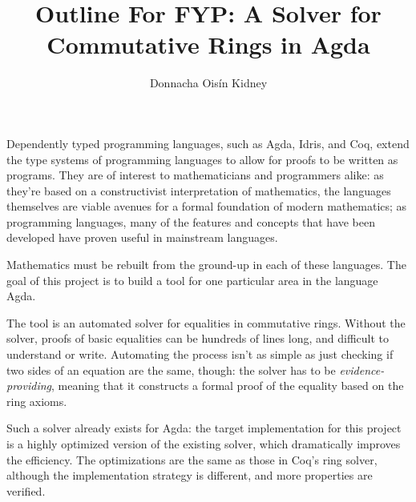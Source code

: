 \documentclass[twocolumn]{article}
\author{Donnacha Oisín Kidney}
\title{Outline For FYP: A Solver for Commutative Rings in Agda}
\begin{document}
\maketitle

Dependently typed programming languages, such as
Agda\cite{norell_dependently_2008}, Idris\cite{brady_idris_2013}, and
Coq\cite{the_coq_development_team_2018_1219885}, extend the type systems of
programming languages to allow for proofs to be written as programs. They are of
interest to mathematicians and programmers alike: as they're based on a
constructivist interpretation of mathematics, the languages themselves are
viable avenues for a formal foundation of modern mathematics; as programming
languages, many of the features and concepts that have been developed have
proven useful in mainstream languages.

Mathematics must be rebuilt from the ground-up in each of these languages. The
goal of this project is to build a tool for one particular area in the language
Agda.

The tool is an automated solver for equalities in commutative rings. Without the
solver, proofs of basic equalities can be hundreds of lines long, and difficult
to understand or write. Automating the process isn't as simple as just checking
if two sides of an equation are the same, though: the solver has to be
\emph{evidence-providing}, meaning that it constructs a formal proof of the
equality based on the ring axioms.

Such a solver already exists for Agda\cite{danielsson_agda_2018}: the target
implementation for this project is a highly optimized version of the existing
solver, which dramatically improves the efficiency. The optimizations are the
same as those in Coq's ring solver\cite{gregoire_proving_2005}, although the
implementation strategy is different, and more properties are verified.


\end{document}
